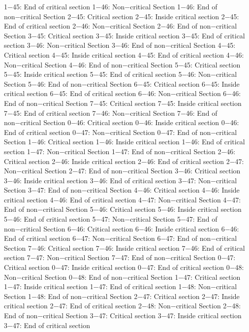 1−45: End of critical section
1−46: Non−critical Section
1−46: End of non−critical Section
2−45: Critical section
2−45: Inside critical section
2−45: End of critical section
2−46: Non−critical Section
2−46: End of non−critical Section
3−45: Critical section
3−45: Inside critical section
3−45: End of critical section
3−46: Non−critical Section
3−46: End of non−critical Section
4−45: Critical section
4−45: Inside critical section
4−45: End of critical section
4−46: Non−critical Section
4−46: End of non−critical Section
5−45: Critical section
5−45: Inside critical section
5−45: End of critical section
5−46: Non−critical Section
5−46: End of non−critical Section
6−45: Critical section
6−45: Inside critical section
6−45: End of critical section
6−46: Non−critical Section
6−46: End of non−critical Section
7−45: Critical section
7−45: Inside critical section
7−45: End of critical section
7−46: Non−critical Section
7−46: End of non−critical Section
0−46: Critical section
0−46: Inside critical section
0−46: End of critical section
0−47: Non−critical Section
0−47: End of non−critical Section
1−46: Critical section
1−46: Inside critical section
1−46: End of critical section
1−47: Non−critical Section
1−47: End of non−critical Section
2−46: Critical section
2−46: Inside critical section
2−46: End of critical section
2−47: Non−critical Section
2−47: End of non−critical Section
3−46: Critical section
3−46: Inside critical section
3−46: End of critical section
3−47: Non−critical Section
3−47: End of non−critical Section
4−46: Critical section
4−46: Inside critical section
4−46: End of critical section
4−47: Non−critical Section
4−47: End of non−critical Section
5−46: Critical section
5−46: Inside critical section
5−46: End of critical section
5−47: Non−critical Section
5−47: End of non−critical Section
6−46: Critical section
6−46: Inside critical section
6−46: End of critical section
6−47: Non−critical Section
6−47: End of non−critical Section
7−46: Critical section
7−46: Inside critical section
7−46: End of critical section
7−47: Non−critical Section
7−47: End of non−critical Section
0−47: Critical section
0−47: Inside critical section
0−47: End of critical section
0−48: Non−critical Section
0−48: End of non−critical Section
1−47: Critical section
1−47: Inside critical section
1−47: End of critical section
1−48: Non−critical Section
1−48: End of non−critical Section
2−47: Critical section
2−47: Inside critical section
2−47: End of critical section
2−48: Non−critical Section
2−48: End of non−critical Section
3−47: Critical section
3−47: Inside critical section
3−47: End of critical section
